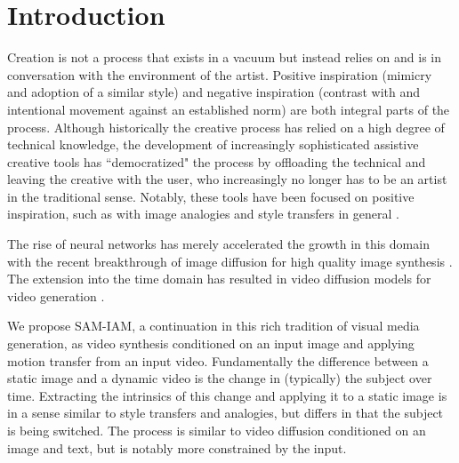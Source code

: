 \section{Introduction}
\label{sec:intro}

Creation is not a process that exists in a vacuum but instead relies on and is in conversation with the environment of the artist. Positive inspiration (mimicry and adoption of a similar style) and negative inspiration (contrast with and intentional movement against an established norm) are both integral parts of the process. Although historically the creative process has relied on a high degree of technical knowledge, the development of increasingly sophisticated assistive creative tools has ``democratized" the process by offloading the technical and leaving the creative with the user, who increasingly no longer has to be an artist in the traditional sense. Notably, these tools have been focused on positive inspiration, such as with image analogies and style transfers in general \cite{2001hertzman}.

The rise of neural networks has merely accelerated the growth in this domain with the recent breakthrough of image diffusion for high quality image synthesis \cite{ho2020denoisingdiffusionprobabilisticmodels}. The extension into the time domain has resulted in video diffusion models for video generation \cite{ho2022videodiffusionmodels}.

We propose SAM-IAM, a continuation in this rich tradition of visual media generation, as video synthesis conditioned on an input image and applying motion transfer from an input video. Fundamentally the difference between a static image and a dynamic video is the change in (typically) the subject over time. Extracting the intrinsics of this change and applying it to a static image is in a sense similar to style transfers and analogies, but differs in that the subject is being switched. The process is similar to video diffusion conditioned on an image and text, but is notably more constrained by the input.

